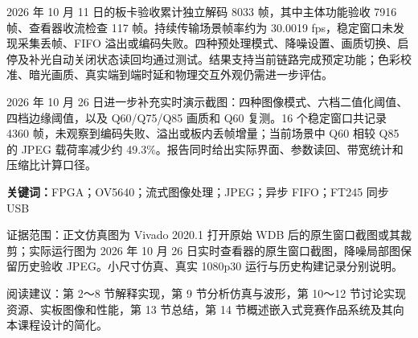 \documentclass[12pt,a4paper]{article}
\newcommand{\note}[1]{\par\noindent\colorbox{shade}{\parbox{\dimexpr\linewidth-2\fboxsep\relax}{\small #1}}\par}
\begin{document}
2026 年 10 月 11 日的板卡验收累计独立解码 8033 帧，其中主体功能验收 7916 帧、查看器收流检查 117 帧。持续传输场景帧率约为 30.0019 fps，稳定窗口未发现采集丢帧、FIFO 溢出或编码失败。四种预处理模式、降噪设置、画质切换、启停及补光自动关闭状态读回均通过测试。结果支持当前链路完成预定功能；色彩校准、暗光画质、真实端到端时延和物理交互外观仍需进一步评估。


2026 年 10 月 26 日进一步补充实时演示截图：四种图像模式、六档二值化阈值、四档边缘阈值，以及 Q60/Q75/Q85 画质和 Q60 复测。16 个稳定窗口共记录 4360 帧，未观察到编码失败、溢出或板内丢帧增量；当前场景中 Q60 相较 Q85 的 JPEG 载荷率减少约 49.3\%。报告同时给出实际界面、参数读回、带宽统计和压缩比计算口径。

\vspace{4mm}\noindent\textbf{关键词：}FPGA；OV5640；流式图像处理；JPEG；异步 FIFO；FT245 同步 USB
\vspace{5mm}
\note{证据范围：正文仿真图为 Vivado 2020.1 打开原始 WDB 后的原生窗口截图或其裁剪；实际运行图为 2026 年 10 月 26 日实时查看器的原生窗口截图，降噪局部图保留历史验收 JPEG。小尺寸仿真、真实 1080p30 运行与历史构建记录分别说明。}
\clearpage
\tableofcontents
\vfill\note{阅读建议：第 2～8 节解释实现，第 9 节分析仿真与波形，第 10～12 节讨论实现资源、实板图像和性能，第 13 节总结，第 14 节概述嵌入式竞赛作品系统及其向本课程设计的简化。}
\clearpage





\end{document}
